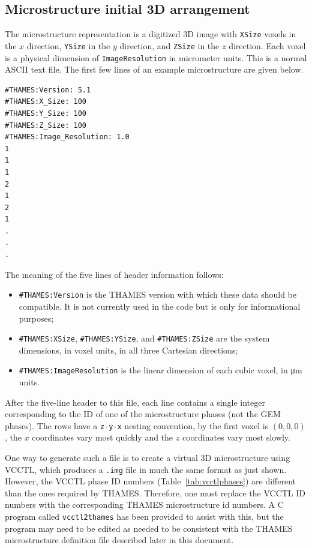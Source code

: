 \documentclass{article}
\newcommand{\us}{\underline{\phantom{X}}}
\begin{document}
\subsection{\label{sec:microstructureinput} Microstructure initial 3D arrangement}
The microstructure representation is a digitized 3D image with \texttt{X{\us}Size} voxels
in the $x$ direction, \texttt{Y{\us}Size} in the $y$ direction, and
\texttt{Z{\us}Size}
in the $z$ direction.  Each voxel is a physical dimension of
\texttt{Image{\us}Resolution} in micrometer units.
This is a normal ASCII text file.  The first few lines of an example microstructure
are given below.

\scriptsize{
	\begin{lstlisting}
#THAMES:Version: 5.1
#THAMES:X_Size: 100
#THAMES:Y_Size: 100
#THAMES:Z_Size: 100
#THAMES:Image_Resolution: 1.0
1
1
1
2
1
2
1
.
.
.
\end{lstlisting}
}

\normalsize{ }
The meaning of the five lines of header information follows:
\begin{itemize}
	\item \verb!#THAMES:Version! is the THAMES version with which these data
	      should be compatible. It is not currently used in the code but is only for
	      informational purposes;
	\item \verb!#!\texttt{THAMES:X{\us}Size}, \verb!#!\texttt{THAMES:Y{\us}Size}, and \verb!#!\texttt{THAMES:Z{\us}Size}
	      are the system dimensions, in voxel units, in all three Cartesian
	      directions;
	\item \verb!#!\texttt{THAMES:Image{\us}Resolution} is the linear dimension of each cubic
	      voxel, in \unit{\micro\meter} units.
\end{itemize}

After the five-line header to this file, each line contains a single integer corresponding to the ID of
one of the microstructure phases (not the GEM phases).  The rows have a
\verb!z-y-x! nesting convention, by the first voxel is $(0,0,0)$, the $x$ coordinates
vary most quickly and the $z$ coordinates vary most slowly.

One way to generate such a file is to create a virtual 3D microstructure using VCCTL,
which produces a \verb!.img! file in much the same format as just shown.  However,
the VCCTL phase ID numbers (Table~\ref{tab:vcctlphases}) are different than the
ones required by THAMES.  Therefore, one must replace
the VCCTL ID numbers with the corresponding THAMES microstructure id numbers.
A C program called \verb!vcctl2thames! has been provided to assist with this, but the
program may need to be edited as needed to be consistent with the THAMES microstructure
definition file described later in this document.
\end{document}
